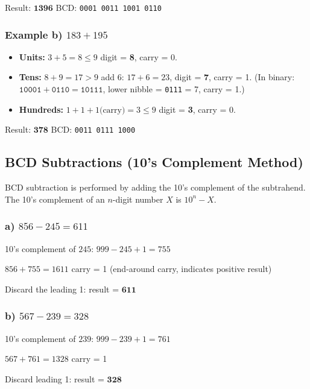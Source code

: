 \documentclass[12pt,a4paper]{article}
\begin{document}
Result: $\mathbf{1396}$ \quad BCD: \texttt{0001\ 0011\ 1001\ 0110}

\subsubsection*{Example b) \quad $183 + 195$}

\begin{itemize}
  \item \textbf{Units:} $3 + 5 = 8 \leq 9$ \quad digit = \textbf{8}, carry = 0.
  \item \textbf{Tens:} $8 + 9 = 17 > 9$ \quad add $6$: $17 + 6 = 23$, digit = \textbf{7}, carry = 1.
        (In binary: $\texttt{10001} + \texttt{0110} = \texttt{10111}$,
        lower nibble = \texttt{0111} = 7, carry = 1.)
  \item \textbf{Hundreds:} $1 + 1 + 1\text{(carry)} = 3 \leq 9$ \quad digit = \textbf{3}, carry = 0.
\end{itemize}

Result: $\mathbf{378}$ \quad BCD: \texttt{0011\ 0111\ 1000}

\subsection{BCD Subtractions (10's Complement Method)}

BCD subtraction is performed by adding the 10's complement of the subtrahend.
The 10's complement of an $n$-digit number $X$ is $10^n - X$.

\subsubsection*{a) \quad $856 - 245 = 611$}

10's complement of $245$: \quad $999 - 245 + 1 = 755$

$856 + 755 = 1611$ \quad carry = 1 (end-around carry, indicates positive result)

Discard the leading 1: result = $\mathbf{611}$

\subsubsection*{b) \quad $567 - 239 = 328$}

10's complement of $239$: \quad $999 - 239 + 1 = 761$

$567 + 761 = 1328$ \quad carry = 1

Discard leading 1: result = $\mathbf{328}$
\end{document}
